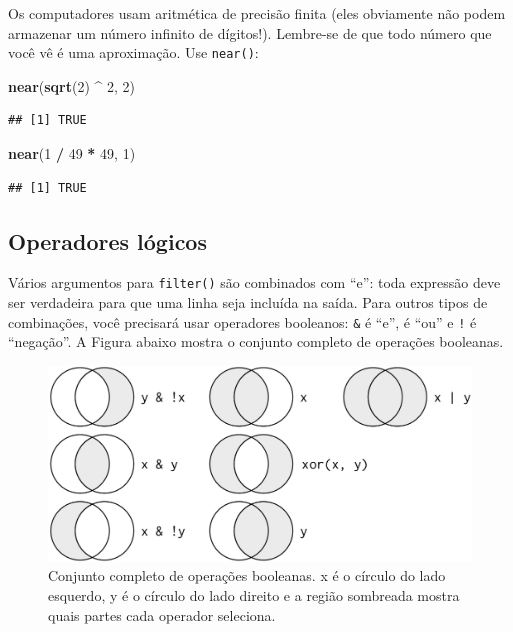 \documentclass[a4paper]{book}
\newenvironment{Shaded}{\begin{snugshade}}{\end{snugshade}}
\newcommand{\DecValTok}[1]{\textcolor[rgb]{0.00,0.00,0.81}{#1}}
\newcommand{\KeywordTok}[1]{\textcolor[rgb]{0.13,0.29,0.53}{\textbf{#1}}}
\newcommand{\NormalTok}[1]{#1}
\newcommand{\OperatorTok}[1]{\textcolor[rgb]{0.81,0.36,0.00}{\textbf{#1}}}
\newcommand{\StringTok}[1]{\textcolor[rgb]{0.31,0.60,0.02}{#1}}
\begin{document}
Os computadores usam aritmética de precisão finita (eles obviamente não podem armazenar um número infinito de dígitos!). Lembre-se de que todo número que você vê é uma aproximação. Use \texttt{near()}:

\begin{Shaded}
\begin{Highlighting}[]
\KeywordTok{near}\NormalTok{(}\KeywordTok{sqrt}\NormalTok{(}\DecValTok{2}\NormalTok{) }\OperatorTok{^}\StringTok{ }\DecValTok{2}\NormalTok{,  }\DecValTok{2}\NormalTok{)}
\end{Highlighting}
\end{Shaded}

\begin{verbatim}
## [1] TRUE
\end{verbatim}

\begin{Shaded}
\begin{Highlighting}[]
\KeywordTok{near}\NormalTok{(}\DecValTok{1} \OperatorTok{/}\StringTok{ }\DecValTok{49} \OperatorTok{*}\StringTok{ }\DecValTok{49}\NormalTok{, }\DecValTok{1}\NormalTok{)}
\end{Highlighting}
\end{Shaded}

\begin{verbatim}
## [1] TRUE
\end{verbatim}

\hypertarget{operadores-luxf3gicos}{%
\subsection{Operadores lógicos}\label{operadores-luxf3gicos}}

Vários argumentos para \texttt{filter()} são combinados com ``e'': toda expressão deve ser verdadeira para que uma linha seja incluída na saída. Para outros tipos de combinações, você precisará usar operadores booleanos: \texttt{\&} é ``e'', \texttt{\textbar{}} é ``ou'' e \texttt{!} é ``negação''. A Figura abaixo mostra o conjunto completo de operações booleanas.

\begin{figure}

{\centering \includegraphics[width=0.7\linewidth]{imagens/transform-logical} 

}

\caption{Conjunto completo de operações booleanas. x é o círculo do lado esquerdo, y é o círculo do lado direito e a região sombreada mostra quais partes cada operador seleciona.}\label{fig:unnamed-chunk-48}
\end{figure}
\end{document}
